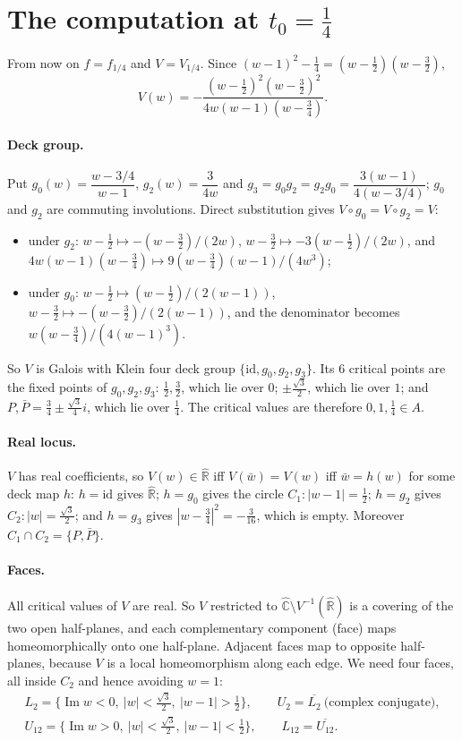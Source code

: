 \documentclass[11pt]{article}
\theoremstyle{definition}
\newcommand{\Ch}{\hat{\mathbb C}}
\newcommand{\Rh}{\hat{\mathbb R}}
\newcommand{\Img}{\operatorname{Im}}
\begin{document}
\section{The computation at \texorpdfstring{$t_0=\tfrac14$}{t0=1/4}}\label{sec:comp}

From now on $f=f_{1/4}$ and $V=V_{1/4}$. Since $(w-1)^2-\tfrac14=(w-\tfrac12)(w-\tfrac32)$,
\[V(w)=-\frac{(w-\frac12)^2(w-\frac32)^2}{4w(w-1)(w-\frac34)} .\]

\paragraph{Deck group.} Put $g_0(w)=\dfrac{w-3/4}{w-1}$, $g_2(w)=\dfrac3{4w}$ and $g_3=g_0g_2=g_2g_0=\dfrac{3(w-1)}{4(w-3/4)}$; $g_0$ and $g_2$ are commuting involutions. Direct substitution gives $V\circ g_0=V\circ g_2=V$:
\begin{itemize}[nosep]
\item under $g_2$: $w-\tfrac12\mapsto-(w-\tfrac32)/(2w)$, $w-\tfrac32\mapsto-3(w-\tfrac12)/(2w)$, and $4w(w-1)(w-\tfrac34)\mapsto 9(w-\tfrac34)(w-1)/(4w^3)$;
\item under $g_0$: $w-\tfrac12\mapsto(w-\tfrac12)/(2(w-1))$, $w-\tfrac32\mapsto-(w-\tfrac32)/(2(w-1))$, and the denominator becomes $w(w-\tfrac34)/(4(w-1)^3)$.
\end{itemize}
So $V$ is Galois with Klein four deck group $\{\mathrm{id},g_0,g_2,g_3\}$. Its $6$ critical points are the fixed points of $g_0,g_2,g_3$:
$\tfrac12,\tfrac32$, which lie over $0$; $\pm\tfrac{\sqrt3}2$, which lie over $1$; and $P,\bar P=\tfrac34\pm\tfrac{\sqrt3}4 i$, which lie over $\tfrac14$. The critical values are therefore $0,1,\tfrac14\in A$.

\paragraph{Real locus.} $V$ has real coefficients, so $V(w)\in\Rh$ iff $V(\bar w)=V(w)$ iff $\bar w=h(w)$ for some deck map $h$:
$h=\mathrm{id}$ gives $\Rh$; $h=g_0$ gives the circle $C_1\colon|w-1|=\tfrac12$; $h=g_2$ gives $C_2\colon|w|=\tfrac{\sqrt3}2$; and $h=g_3$ gives $|w-\tfrac34|^2=-\tfrac3{16}$, which is empty. Moreover $C_1\cap C_2=\{P,\bar P\}$.

\paragraph{Faces.} All critical values of $V$ are real. So $V$ restricted to $\Ch\setminus V^{-1}(\Rh)$ is a covering of the two open half-planes, and each complementary component (face) maps homeomorphically onto one half-plane. Adjacent faces map to opposite half-planes, because $V$ is a local homeomorphism along each edge. We need four faces, all inside $C_2$ and hence avoiding $w=1$:
\begin{gather*}
L_2=\{\Img w<0,\ |w|<\tfrac{\sqrt3}2,\ |w-1|>\tfrac12\},\qquad U_2=\overline{L_2}\ \text{(complex conjugate)},\\
U_{12}=\{\Img w>0,\ |w|<\tfrac{\sqrt3}2,\ |w-1|<\tfrac12\},\qquad L_{12}=\overline{U_{12}}.
\end{gather*}
\end{document}
